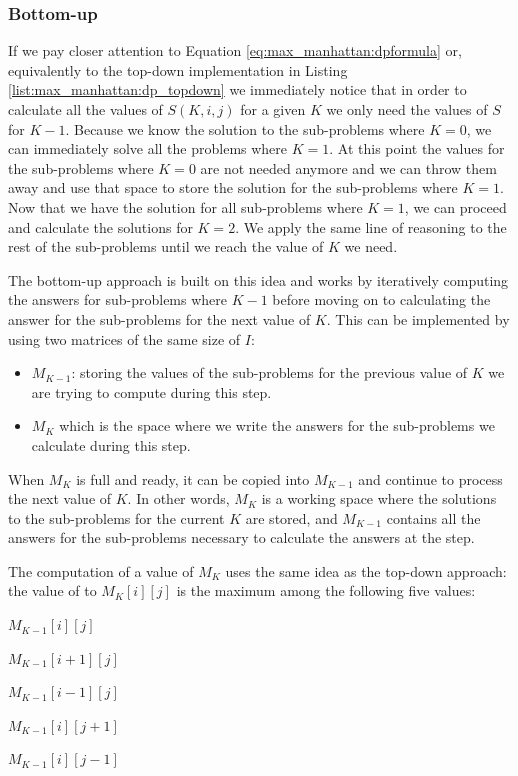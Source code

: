 \subsubsection{Bottom-up}
If we pay closer attention to Equation \ref{eq:max_manhattan:dpformula} or, equivalently to the
top-down implementation in Listing \ref{list:max_manhattan:dp_topdown} we immediately notice that in
order to calculate all the values of $S(K,i,j)$ for a given $K$ we only need the values of $S$ for
$K-1$. Because we know the solution to the sub-problems where $K=0$, we can immediately solve
all the problems where $K=1$. At this point the values for the sub-problems where $K=0$ are not
needed anymore and we can throw them away and use that space to store the solution for the
sub-problems where $K=1$. Now that we have the solution for all sub-problems where $K=1$, we can proceed and calculate the
solutions for $K=2$. We apply the same line of reasoning to the rest of the sub-problems
 until we reach the value of $K$ we need.

The bottom-up approach is built on this idea and works by iteratively computing the answers for
sub-problems where $K-1$ before moving on to calculating the answer for the sub-problems for the next
value of $K$. This can be implemented by using two matrices of the same size of $I$:
\begin{itemize}
    \item $M_{K-1}$: storing the values of the sub-problems for the previous value of $K$ we are
    trying to compute during this step.
    \item $M_{K}$ which is the space where we write the answers for the sub-problems we calculate
    during this step.
\end{itemize}
When $M_{K}$ is full and ready, it can be copied into $M_{K-1}$ and continue to process the next
value of $K$. In other words, $M_{K}$ is a working space where the solutions to the sub-problems for
the current $K$ are stored, and $M_{K-1}$ contains all the answers for the sub-problems necessary to
calculate the answers at the step.

The computation of a value of $M_{K}$ uses the same idea as the top-down approach: the value of
to $M_K[i][j]$ is the maximum  among the following five values: 
\begin{enumerate*}
    \item $M_{K-1}[i][j]$
    \item $M_{K-1}[i+1][j]$
    \item $M_{K-1}[i-1][j]$
    \item $M_{K-1}[i][j+1]$
    \item $M_{K-1}[i][j-1]$
\end{enumerate*}

